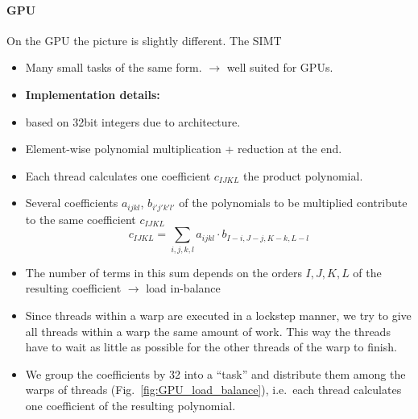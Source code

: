 \documentclass[oribibl,a4paper]{llncs2e/llncs}
\begin{document}
\paragraph{GPU}
On the GPU the picture is slightly different. The SIMT
\begin{itemize}
\item Many small tasks of the same form. $\rightarrow$ well suited for GPUs.
\item {\bf Implementation details:}
\item based on 32bit integers due to architecture.
\item Element-wise polynomial multiplication + reduction at the end.
\item Each thread calculates one coefficient $c_{IJKL}$ the product polynomial.
\item Several coefficients $a_{ijkl}$, $b_{i'j'k'l'}$ of the polynomials to be multiplied contribute to the same coefficient $c_{IJKL}$
\begin{equation}
    c_{IJKL} = \sum_{i,j,k,l} a_{ijkl} \cdot b_{I-i,J-j,K-k,L-l}
\end{equation}
\item The number of terms in this sum depends on the orders $I,J,K,L$ of the resulting coefficient $\rightarrow$ load in-balance
\item Since threads within a warp are executed in a lockstep manner, we try to give all threads within a warp the same amount of work. This way the threads have to wait as little as possible for the other threads of the warp to finish.
\item We group the coefficients by 32 into a ``task'' and distribute them among the warps of threads (Fig.\ \ref{fig:GPU_load_balance}), i.e.\ each thread calculates one coefficient of the resulting polynomial.
\begin{figure}[t]
    \centering
    \mbox{
}
\end{figure}
\end{itemize}
\end{document}
